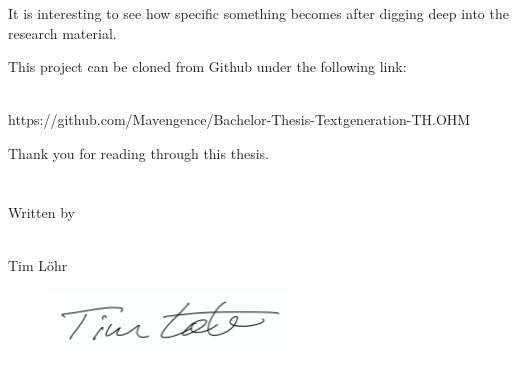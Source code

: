 It is interesting to see how specific something becomes after digging deep into the research material.

This project can be cloned from Github under the following link: \\ \\

\begin{tcolorbox}
	https://github.com/Mavengence/Bachelor-Thesis-Textgeneration-TH.OHM 
\end{tcolorbox} 




Thank you for reading through this thesis. \\ \\ \\

Written by \\ \\
\begin{center}
	\large Tim Löhr
\end{center}


\begin{figure}[H]
	\centering
	\includegraphics[width=2.5in]{photos/sign}
\end{figure}